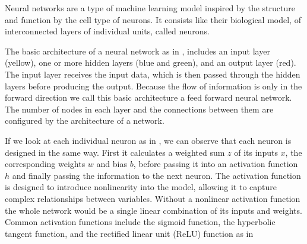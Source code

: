
Neural networks are a type of machine learning model inspired by the structure and function by the cell type of neurons. It consists like their biological model, of interconnected layers of individual units, called neurons.

The basic architecture of a neural network as in ,  includes an input layer (yellow), one or more hidden layers (blue and green), and an output layer (red). The input layer receives the input data, which is then passed through the hidden layers before producing the output. Because the flow of information is only in the forward direction we call this basic architecture a feed forward neural network. The number of nodes in each layer and the connections between them are configured by the architecture of a network.



If we look at each individual neuron as in , we can observe that each neuron is designed in the same way. First it calculates a weighted sum $z$ of its inputs $x$, the corresponding weights $w$ and bias $b$, before passing it into an activation function $h$ and finally passing the information to the next neuron. The activation function is designed to introduce nonlinearity into the model, allowing it to capture complex relationships between variables. Without a nonlinear activation function the whole network would be a single linear combination of its inputs and weights. Common activation functions include the sigmoid function, the hyperbolic tangent function, and the rectified linear unit (ReLU) function as in 




